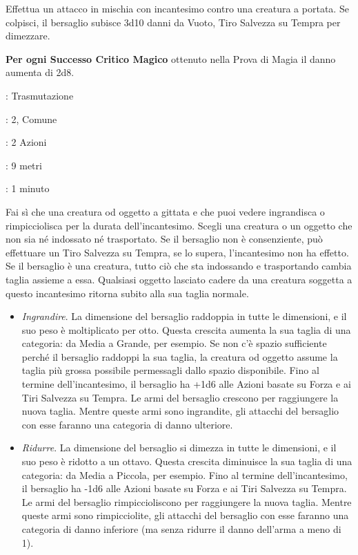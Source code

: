 \begin{multicols}{2}
Effettua un attacco in mischia con incantesimo contro una creatura a portata. Se colpisci, il bersaglio subisce 3d10 danni da Vuoto, Tiro Salvezza su Tempra per dimezzare.

\textbf{Per ogni Successo Critico Magico} ottenuto nella Prova di Magia il danno aumenta di 2d8.

\noindent\colorbox{OBSSgold!10}{
\begin{minipage}{0.95\linewidth}
\begin{description}[noitemsep, topsep=0pt, parsep=0pt, partopsep=0pt, leftmargin=0cm, labelwidth=1.3cm]
	\item[\textbf{Lista}]: Trasmutazione
	\item[\textbf{Livello}]: 2, Comune
	\item[\textbf{Lancio}]: 2 Azioni
	\item[\textbf{Gittata}]: 9 metri
	\item[\textbf{Durata}]: 1 minuto
\end{description}
\end{minipage}}\smallskip

Fai sì che una creatura od oggetto a gittata e che puoi vedere ingrandisca o rimpicciolisca per la durata dell'incantesimo. Scegli una creatura o un oggetto che non sia né indossato né trasportato. Se il bersaglio non è consenziente, può effettuare un Tiro Salvezza su Tempra, se lo supera, l'incantesimo non ha effetto. Se il bersaglio è una creatura, tutto ciò che sta indossando e trasportando cambia taglia assieme a essa. Qualsiasi oggetto lasciato cadere da una creatura soggetta a questo incantesimo ritorna subito alla sua taglia normale.

\begin{itemize}[leftmargin=*] \setlength{\itemsep}{0pt}
	\item \emph{Ingrandire}. La dimensione del bersaglio raddoppia in tutte le dimensioni, e il suo peso è moltiplicato per otto. Questa crescita aumenta la sua taglia di una categoria: da Media a Grande, per esempio. Se non c'è spazio sufficiente perché il bersaglio raddoppi la sua taglia, la creatura od oggetto assume la taglia più grossa possibile permessagli dallo spazio disponibile. Fino al termine dell'incantesimo, il bersaglio ha +1d6 alle Azioni basate su Forza e ai Tiri Salvezza su Tempra. Le armi del bersaglio crescono per raggiungere la nuova taglia. Mentre queste armi sono ingrandite, gli attacchi del bersaglio con esse faranno una categoria di danno ulteriore.
	\item \emph{Ridurre}. La dimensione del bersaglio si dimezza in tutte le dimensioni, e il suo peso è ridotto a un ottavo. Questa crescita diminuisce la sua taglia di una categoria: da Media a Piccola, per esempio. Fino al termine dell'incantesimo, il bersaglio ha -1d6 alle Azioni basate su Forza e ai Tiri Salvezza su Tempra. Le armi del bersaglio rimpiccioliscono per raggiungere la nuova taglia. Mentre queste armi sono rimpicciolite, gli attacchi del bersaglio con esse faranno una categoria di danno inferiore (ma senza ridurre il danno dell'arma a meno di 1).
\end{itemize}


\end{multicols}
